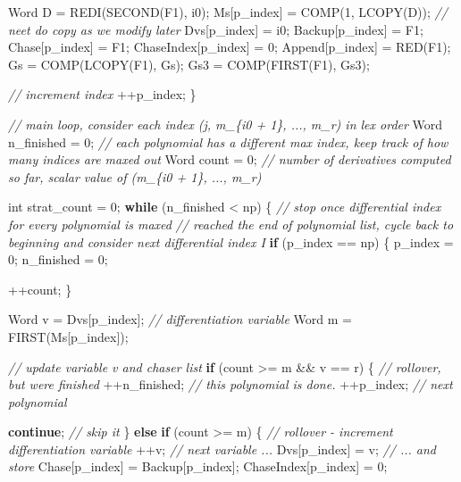 \documentclass[
]{book}
\newenvironment{Shaded}{\begin{snugshade}}{\end{snugshade}}
\newcommand{\CommentTok}[1]{\textcolor[rgb]{0.56,0.35,0.01}{\textit{#1}}}
\newcommand{\ControlFlowTok}[1]{\textcolor[rgb]{0.13,0.29,0.53}{\textbf{#1}}}
\newcommand{\DataTypeTok}[1]{\textcolor[rgb]{0.13,0.29,0.53}{#1}}
\newcommand{\DecValTok}[1]{\textcolor[rgb]{0.00,0.00,0.81}{#1}}
\newcommand{\NormalTok}[1]{#1}
\theoremstyle{definition}
\theoremstyle{definition}
\theoremstyle{definition}
\theoremstyle{definition}
\theoremstyle{remark}
\begin{document}
\begin{Shaded}
\begin{Highlighting}[numbers=left,,]
\NormalTok{        Word D = REDI(SECOND(F1), i0);}
\NormalTok{        Ms[p\_index] = COMP(}\DecValTok{1}\NormalTok{, LCOPY(D)); }\CommentTok{// neet do copy as we modify later}
\NormalTok{        Dvs[p\_index] = i0;}
\NormalTok{        Backup[p\_index] = F1;}
\NormalTok{        Chase[p\_index] = F1;}
\NormalTok{        ChaseIndex[p\_index] = }\DecValTok{0}\NormalTok{;}
\NormalTok{        Append[p\_index] = RED(F1);}
\NormalTok{        Gs = COMP(LCOPY(F1), Gs);}
\NormalTok{        Gs3 = COMP(FIRST(F1), Gs3);}

        \CommentTok{// increment index}
\NormalTok{        ++p\_index;}
\NormalTok{    \}}

    \CommentTok{// main loop, consider each index (j, m\_\{i0 + 1\}, ..., m\_r) in lex order}
\NormalTok{    Word n\_finished = }\DecValTok{0}\NormalTok{; }\CommentTok{// each polynomial has a different max index, keep track of how many indices are maxed out}
\NormalTok{    Word count = }\DecValTok{0}\NormalTok{; }\CommentTok{// number of derivatives computed so far, scalar value of (m\_\{i0 + 1\}, ..., m\_r)}

    \DataTypeTok{int}\NormalTok{ strat\_count = }\DecValTok{0}\NormalTok{;}
    \ControlFlowTok{while}\NormalTok{ (n\_finished \textless{} np) \{ }\CommentTok{// stop once differential index for every polynomial is maxed}
        \CommentTok{// reached the end of polynomial list, cycle back to beginning and consider next differential index I}
        \ControlFlowTok{if}\NormalTok{ (p\_index == np) \{}
\NormalTok{            p\_index = }\DecValTok{0}\NormalTok{;}
\NormalTok{            n\_finished = }\DecValTok{0}\NormalTok{;}

\NormalTok{            ++count;}
\NormalTok{        \}}

\NormalTok{        Word v = Dvs[p\_index]; }\CommentTok{// differentiation variable}
\NormalTok{        Word m = FIRST(Ms[p\_index]);}

        \CommentTok{// update variable v and chaser list}
        \ControlFlowTok{if}\NormalTok{ (count \textgreater{}= m \&\& v == r) \{ }\CommentTok{// rollover, but we\textquotesingle{}re finished}
\NormalTok{            ++n\_finished; }\CommentTok{// this polynomial is done.}
\NormalTok{            ++p\_index; }\CommentTok{// next polynomial}

            \ControlFlowTok{continue}\NormalTok{; }\CommentTok{// skip it}
\NormalTok{        \} }\ControlFlowTok{else} \ControlFlowTok{if}\NormalTok{ (count \textgreater{}= m) \{ }\CommentTok{// rollover {-} increment differentiation variable}
\NormalTok{            ++v; }\CommentTok{// next variable ...}
\NormalTok{            Dvs[p\_index] = v; }\CommentTok{// ... and store}
\NormalTok{            Chase[p\_index] = Backup[p\_index];}
\NormalTok{            ChaseIndex[p\_index] = }\DecValTok{0}\NormalTok{;}


\end{Highlighting}
\end{Shaded}
\end{document}
